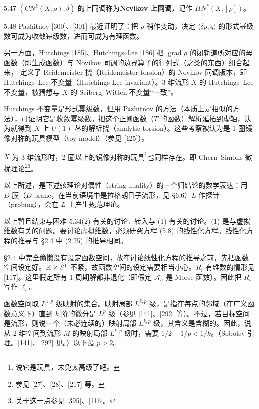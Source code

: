 \begin{definition}{5.47}
  $(CN^k(X;\rho),\delta)$ 的上同调称为\textbf{Novikov 上同调}，记作 $HN^*(X;[\rho])$。
\end{definition}

\begin{remark}{5.48}
  Pazhitnov [300]、[301] 最近证明了：把 $\rho$ 稍作变动，决定 $\langle\delta p,q\rangle$ 的形式幂级数可成为收敛幂级数，进而可成为有理函数。

  另一方面，Hutchings [185]、Hutchings–Lee [186] 把 $\operatorname{grad}\rho$ 的闭轨道所对应的母函数（即生成函数）与 Novikov 同调的边界算子的行列式（之类的东西）组合起来，
  定义了 Reidemeister 挠（Reidemeister torsion）的 Novikov 同调版本，即 Hutchings–Lee 不变量（Hutchings-Lee invariant）。3 维流形 $X$ 的 Hutchings–Lee 不变量，被猜想与 $X$ 的 Seiberg–Witten 不变量“一致”。

  Hutchings 不变量是形式幂级数，但用 Pazhitnov 的方法（本质上是相似的方法），可证明它是收敛幂级数。把这个正则函数（$T$ 的函数）解析延拓到虚轴，认为就得到 $X$ 上 $U(1)$ 丛的解析挠（analytic torsion）。这些考察被认为是 1-圈镜像对称的玩具模型（toy model）（参见 [125]）。

  $X$ 为 3 维流形时，2 圈以上的镜像对称的玩具\footnote{说它是玩具，未免太高级了吧。}也同样存在。即 Chern–Simons 微扰理论\footnote{参见 [27]、[28]、[217] 等。}\footnote{关于这一点参见 [395]、[116]。}。

  以上所述，是下述弦理论对偶性（string duality）的一个归结论的数学表达：用 $D$-膜（$D$ brane，在当前语境中是拉格朗日子流形，见 §6.6）$L$ 作探针（probing），会在 $L$ 上产生规范理论。
\end{remark}

以上暂且结束与困难 5.34(2) 有关的讨论，转入与 (1) 有关的讨论。(1) 是与虚拟维数有关的问题。要讨论虚拟维数，必须研究方程 (5.8) 的线性化方程。线性化方程的推导与 §2.4 中 (2.25) 的推导相同。

§2.4 中完全偷懒没有设定函数空间，故在讨论线性化方程的推导之前，先把函数空间设定好。$\mathbb{R}\times S^1$ 不紧，故函数空间的设定需要相当小心。$R_i$ 有维数的情形见 [117]。这里假定所有 1 周期解都非退化（即假定 $\mathcal{A}_h$ 是 Morse 函数）。因此把 $R_i$ 写作 $\ell_i$。

函数空间取 $L^{1,p}$ 级映射的集合。映射局部 $L^{k,p}$ 级，是指在每点的邻域（在广义函数意义下）直到 $k$ 阶的微分是 $L^p$ 级（参见 [141]、[292] 等）。不过，若目标空间是流形，则说一个（未必连续的）映射局部
$L^{k,p}$ 级，其含义是含糊的。因此，说从 2 维空间到流形 $M$ 的映射局部 $L^{k,p}$ 级时，需要 $1/2+1/p<1/k$。（Sobolev 引理。[141]、[292] 见。）以下设 $p>2$。

